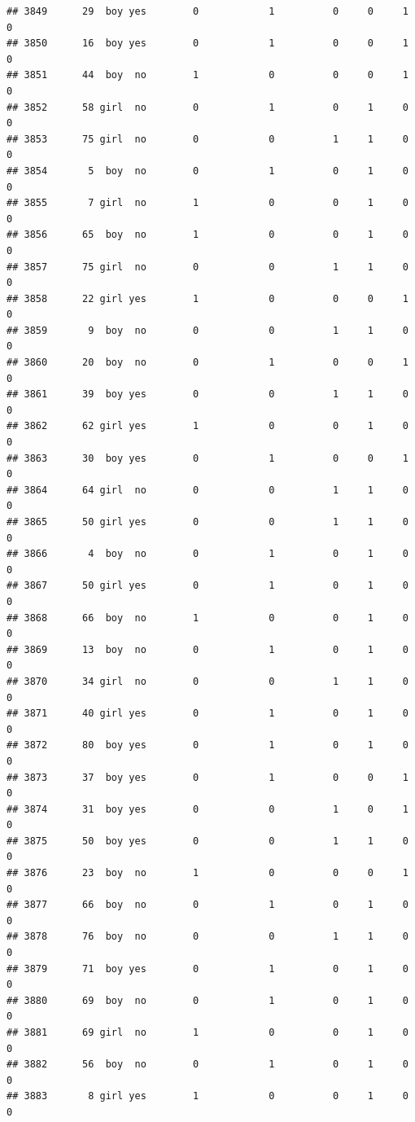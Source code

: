 \documentclass[man]{apa6}
\begin{document}
\begin{verbatim}
## 3849      29  boy yes        0            1          0     0     1     0
## 3850      16  boy yes        0            1          0     0     1     0
## 3851      44  boy  no        1            0          0     0     1     0
## 3852      58 girl  no        0            1          0     1     0     0
## 3853      75 girl  no        0            0          1     1     0     0
## 3854       5  boy  no        0            1          0     1     0     0
## 3855       7 girl  no        1            0          0     1     0     0
## 3856      65  boy  no        1            0          0     1     0     0
## 3857      75 girl  no        0            0          1     1     0     0
## 3858      22 girl yes        1            0          0     0     1     0
## 3859       9  boy  no        0            0          1     1     0     0
## 3860      20  boy  no        0            1          0     0     1     0
## 3861      39  boy yes        0            0          1     1     0     0
## 3862      62 girl yes        1            0          0     1     0     0
## 3863      30  boy yes        0            1          0     0     1     0
## 3864      64 girl  no        0            0          1     1     0     0
## 3865      50 girl yes        0            0          1     1     0     0
## 3866       4  boy  no        0            1          0     1     0     0
## 3867      50 girl yes        0            1          0     1     0     0
## 3868      66  boy  no        1            0          0     1     0     0
## 3869      13  boy  no        0            1          0     1     0     0
## 3870      34 girl  no        0            0          1     1     0     0
## 3871      40 girl yes        0            1          0     1     0     0
## 3872      80  boy yes        0            1          0     1     0     0
## 3873      37  boy yes        0            1          0     0     1     0
## 3874      31  boy yes        0            0          1     0     1     0
## 3875      50  boy yes        0            0          1     1     0     0
## 3876      23  boy  no        1            0          0     0     1     0
## 3877      66  boy  no        0            1          0     1     0     0
## 3878      76  boy  no        0            0          1     1     0     0
## 3879      71  boy yes        0            1          0     1     0     0
## 3880      69  boy  no        0            1          0     1     0     0
## 3881      69 girl  no        1            0          0     1     0     0
## 3882      56  boy  no        0            1          0     1     0     0
## 3883       8 girl yes        1            0          0     1     0     0

\end{verbatim}
\end{document}
